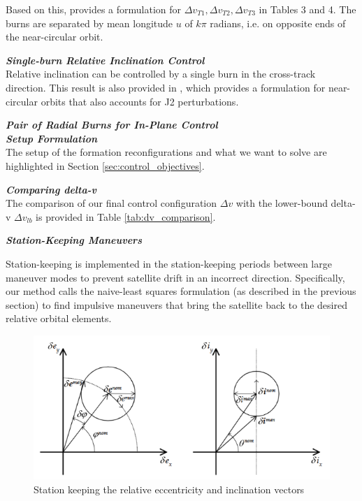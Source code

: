 Based on this, \cite{chernick2018new} provides a formulation for $\Delta v_{T1}, \Delta v_{T2}, \Delta v_{T3}$ in Tables 3 and 4. The burns are separated by mean longitude $u$ of $k\pi$ radians, i.e. on opposite ends of the near-circular orbit. 

\textit{\textbf{Single-burn Relative Inclination Control}}\\

Relative inclination can be controlled by a single burn in the cross-track direction. This result is also provided in \cite{chernick2018new}, which provides a formulation for near-circular orbits that also accounts for J2 perturbations.


\textit{\textbf{Pair of Radial Burns for In-Plane Control}}\\

\textbf{\textit{Setup Formulation}} \\
The setup of the formation reconfigurations and what we want to solve are highlighted in Section \ref{sec:control_objectives}.

\textbf{\textit{Comparing delta-v}} \\
The comparison of our final control configuration $\Delta v$ with the lower-bound delta-v $\Delta v_{lb}$ is provided in Table \ref{tab:dv_comparison}.

\textbf{\textit{Station-Keeping Maneuvers}}

Station-keeping is implemented in the station-keeping periods between large maneuver modes to prevent satellite drift in an incorrect direction. Specifically, our method calls the naive-least squares formulation (as described in the previous section) to find impulsive maneuvers that bring the satellite back to the desired relative orbital elements.
\begin{figure}[H]
    \centering
    \includegraphics[width=0.75\linewidth]{sim//figures//PS5/station_keeping_man_damico.png}
    \caption{Station keeping the relative eccentricity and inclination vectors \cite{damicothesis}}
    \label{fig:station_keeping_guide}
\end{figure}

